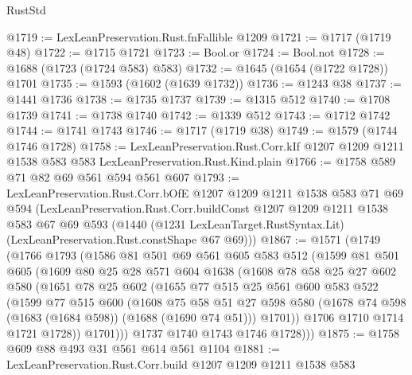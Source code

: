 \begin{lexlean}{RustStd}
\begin{coremodule}
@1719 := LexLeanPreservation.Rust.fnFallible @1209
@1721 := @1717 (@1719 @48)
@1722 := @1715 @1721
@1723 := Bool.or
@1724 := Bool.not
@1728 := @1688 (@1723 (@1724 @583) @583)
@1732 := @1645 (@1654 (@1722 @1728)) @1701
@1735 := @1593 (@1602 (@1639 @1732))
@1736 := @1243 @38
@1737 := @1441 @1736
@1738 := @1735 @1737
@1739 := @1315 @512
@1740 := @1708 @1739
@1741 := @1738 @1740
@1742 := @1339 @512
@1743 := @1712 @1742
@1744 := @1741 @1743
@1746 := @1717 (@1719 @38)
@1749 := @1579 (@1744 @1746 @1728)
@1758 := LexLeanPreservation.Rust.Corr.kIf
    @1207
    @1209
    @1211
    @1538
    @583
    @583
    LexLeanPreservation.Rust.Kind.plain
@1766 := @1758 @589 @71 @82 @69 @561 @594 @561 @607
@1793 := LexLeanPreservation.Rust.Corr.bOfE
    @1207
    @1209
    @1211
    @1538
    @583
    @71
    @69
    @594
    (LexLeanPreservation.Rust.Corr.buildConst
      @1207
      @1209
      @1211
      @1538
      @583
      @67
      @69
      @593
      (@1440 (@1231 LexLeanTarget.RustSyntax.Lit) (LexLeanPreservation.Rust.constShape @67 @69)))
@1867 := @1571
    (@1749
      (@1766
        @1793
        (@1586
          @81
          @501
          @69
          @561
          @605
          @583
          @512
          (@1599
            @81
            @501
            @605
            (@1609
              @80
              @25
              @28
              @571
              @604
              @1638
              (@1608
                @78
                @58
                @25
                @27
                @602
                @580
                (@1651
                  @78
                  @25
                  @602
                  (@1655
                    @77
                    @515
                    @25
                    @561
                    @600
                    @583
                    @522
                    (@1599
                      @77
                      @515
                      @600
                      (@1608
                        @75
                        @58
                        @51
                        @27
                        @598
                        @580
                        (@1678 @74 @598 (@1683 (@1684 @598)) (@1688 (@1690 @74 @51)))
                        @1701))
                    @1706
                    @1710
                    @1714
                    @1721
                    @1728))
                @1701)))
          @1737
          @1740
          @1743
          @1746
          @1728)))
@1875 := @1758 @609 @88 @493 @31 @561 @614 @561 @1104
@1881 := LexLeanPreservation.Rust.Corr.build @1207 @1209 @1211 @1538 @583

\end{coremodule}
\end{lexlean}

